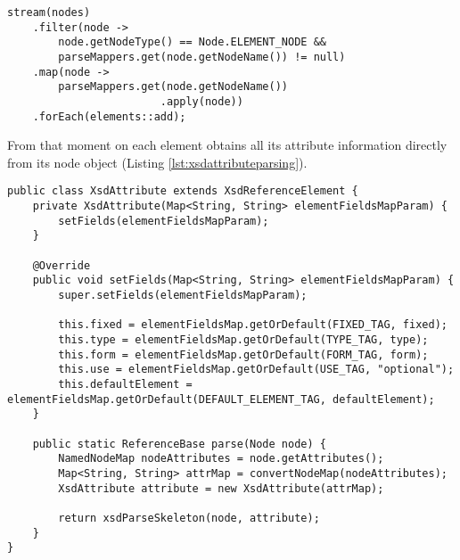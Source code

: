 \begin{minipage}{\linewidth}
\begin{lstlisting}[caption={XsdParser Node Parsing Process},captionpos=b,label={lst:nodeparsingprocess}]
stream(nodes)
    .filter(node -> 
        node.getNodeType() == Node.ELEMENT_NODE && 
        parseMappers.get(node.getNodeName()) != null)
    .map(node -> 
        parseMappers.get(node.getNodeName())
                        .apply(node))
    .forEach(elements::add);
\end{lstlisting}
\end{minipage}

\noindent
From that moment on each element obtains all its attribute information directly from its node object (Listing \ref{lst:xsdattributeparsing}). 

\medskip

\begin{minipage}{\linewidth}
\begin{lstlisting}[caption={XsdAttribute Information Extraction (Simplified)},captionpos=b,label={lst:xsdattributeparsing}]
public class XsdAttribute extends XsdReferenceElement {
    private XsdAttribute(Map<String, String> elementFieldsMapParam) {
        setFields(elementFieldsMapParam);
    }

    @Override
    public void setFields(Map<String, String> elementFieldsMapParam) {
        super.setFields(elementFieldsMapParam);

        this.fixed = elementFieldsMap.getOrDefault(FIXED_TAG, fixed);
        this.type = elementFieldsMap.getOrDefault(TYPE_TAG, type);
        this.form = elementFieldsMap.getOrDefault(FORM_TAG, form);
        this.use = elementFieldsMap.getOrDefault(USE_TAG, "optional");
        this.defaultElement = elementFieldsMap.getOrDefault(DEFAULT_ELEMENT_TAG, defaultElement);
    }
    
    public static ReferenceBase parse(Node node) {
        NamedNodeMap nodeAttributes = node.getAttributes();
        Map<String, String> attrMap = convertNodeMap(nodeAttributes);        
        XsdAttribute attribute = new XsdAttribute(attrMap);    
    
        return xsdParseSkeleton(node, attribute);
    }
}
\end{lstlisting}
\end{minipage}

